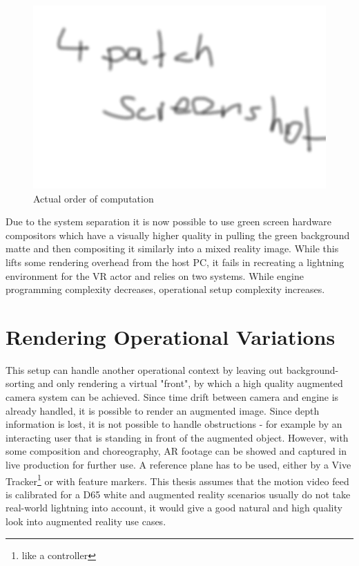 \begin{figure}[htb]
	\includegraphics[width=\textwidth]{_raw_resources/4patch_composite.png}
	\caption{Actual order of computation}
	\label{fig:alt-render:4patch}
\end{figure}

Due to the system separation it is now possible to use green screen hardware 
compositors which have a visually higher quality in pulling the green 
background matte and then compositing it similarly into a mixed reality image. 
While this lifts some rendering overhead from the host PC, it fails in 
recreating a lightning environment for the VR actor and relies on two systems. 
While engine programming complexity decreases, operational setup complexity 
increases.

\section{Rendering Operational Variations}

This setup can handle another operational context by leaving out 
background-sorting and only rendering a virtual "front", by which a high 
quality augmented camera system can be achieved. Since time drift between 
camera and engine is already handled, it is possible to render an augmented 
image. Since depth information is lost, it is not possible to handle 
obstructions - for example by an interacting user that is standing in front of 
the augmented object. However, with some composition and choreography, AR 
footage can be showed and captured in live production for further use. A 
reference plane has to be used, either by a Vive Tracker\footnote{like a 
controller} or with feature markers.
\newline
This thesis assumes that the motion video feed is calibrated for a D65 white 
and augmented reality scenarios usually do not take real-world lightning into 
account, it would give a good natural and high quality look into augmented 
reality use cases.


